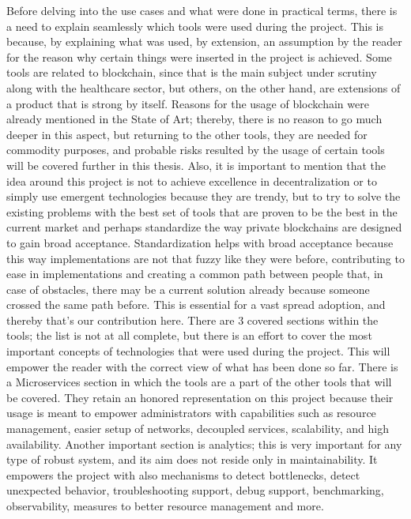 Before delving into the use cases and what were done in practical terms, there is a need to explain seamlessly which tools were 
used during the project. This is because, by explaining what was used, by extension, an assumption by the reader for the reason why 
certain things were inserted in the project is achieved. Some tools are related to blockchain, since that is the main subject under 
scrutiny along with the healthcare sector, but others, on the other hand, are extensions of a product that is strong by itself. Reasons 
for the usage of blockchain were already mentioned in the State of Art; thereby, there is no reason to go much deeper in this aspect, but 
returning to the other tools, they are needed for commodity purposes, and probable risks resulted by the usage of certain tools will be 
covered further in this thesis. Also, it is important to mention that the idea around this project is not to achieve excellence in 
decentralization or to simply use emergent technologies because they are trendy, but to try to solve the existing problems with the best set 
of tools that are proven to be the best in the current market and perhaps standardize the way private blockchains are designed to gain broad 
acceptance. Standardization helps with broad acceptance because this way implementations are not that fuzzy like they were before, 
contributing to ease in implementations and creating a common path between people that, in case of obstacles, there may be a current 
solution already because someone crossed the same path before. This is essential for a vast spread adoption, and thereby that's our 
contribution here.
There are 3 covered sections within the tools; the list is not at all complete, but there is an effort to cover the most important concepts 
of technologies that were used during the project. This will empower the reader with the correct view of what has been done so far.
There is a Microservices section in which the tools are a part of the other tools that will be covered. They retain an honored representation 
on this project because their usage is meant to empower administrators with capabilities such as resource management, easier setup of 
networks, decoupled services, scalability, and high availability.
Another important section is analytics; this is very important for any type of robust system, and its aim does not reside only in 
maintainability. It empowers the project with also mechanisms to detect bottlenecks, detect unexpected behavior, troubleshooting support, 
debug support, benchmarking, observability, measures to better resource management and more.

